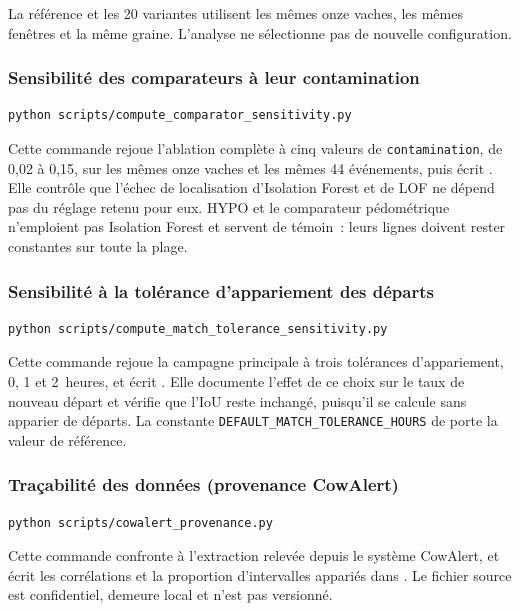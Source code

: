 La référence et les 20 variantes utilisent les mêmes onze vaches, les mêmes fenêtres et
la même graine. L'analyse ne sélectionne pas de nouvelle configuration.

\subsubsection{Sensibilité des comparateurs à leur contamination}
\begin{verbatim}
python scripts/compute_comparator_sensitivity.py
\end{verbatim}

Cette commande rejoue l'ablation complète à cinq valeurs de \texttt{contamination}, de 0,02 à
0,15, sur les mêmes onze vaches et les mêmes 44 événements, puis écrit
. Elle contrôle que l'échec de
localisation d'Isolation Forest et de LOF ne dépend pas du réglage retenu pour eux. HYPO et le
comparateur pédométrique n'emploient pas Isolation Forest et servent de témoin~: leurs lignes
doivent rester constantes sur toute la plage.

\subsubsection{Sensibilité à la tolérance d'appariement des départs}
\begin{verbatim}
python scripts/compute_match_tolerance_sensitivity.py
\end{verbatim}

Cette commande rejoue la campagne principale à trois tolérances d'appariement, 0, 1 et
2~heures, et écrit . Elle documente l'effet
de ce choix sur le taux de nouveau départ et vérifie que l'IoU reste inchangé, puisqu'il se
calcule sans apparier de départs. La constante
\texttt{DEFAULT\_MATCH\_TOLERANCE\_HOURS} de  porte la
valeur de référence.

\subsubsection{Traçabilité des données (provenance CowAlert)}
\begin{verbatim}
python scripts/cowalert_provenance.py
\end{verbatim}

Cette commande confronte  à l'extraction
 relevée depuis le système CowAlert, et écrit les corrélations
et la proportion d'intervalles appariés dans . Le
fichier source est confidentiel, demeure local et n'est pas versionné.

